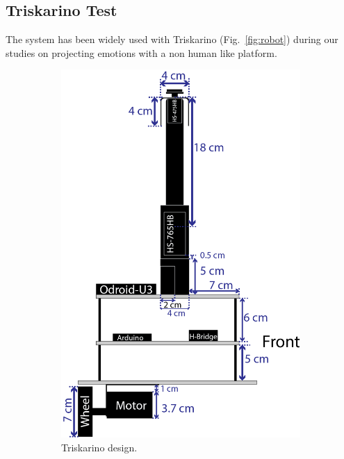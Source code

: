 \subsection{Triskarino Test}
 The system has been widely used with Triskarino (Fig.~\ref{fig:robot}) during our studies on projecting emotions with a non human like platform. 
\begin{figure}
	\centering
	\begin{subfigure}[c]{0.2\textwidth}
	\includegraphics[width=\textwidth]{./Images/upperFourthD.png}
	\caption{Triskarino design.}
	\label{fig:design}
	\end{subfigure}
	\begin{subfigure}[c]{0.2\textwidth}

\end{subfigure}
\end{figure}

